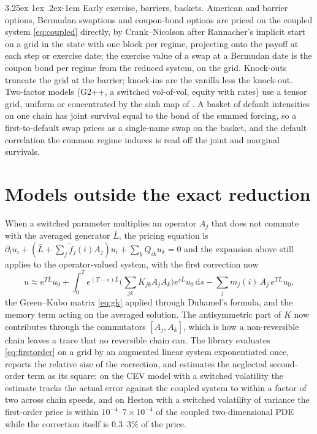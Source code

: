 \documentclass[11pt]{article}
\makeatletter
\renewcommand\paragraph{\@startsection{paragraph}{4}{\z@}%
  {3.25ex \@plus1ex \@minus.2ex}{-1em}%
  {\normalfont\normalsize\itshape}}
\theoremstyle{remark}
\newcommand{\dd}{\,\mathrm{d}}
\makeatother
\begin{document}
\paragraph{Early exercise, barriers, baskets.}
American and barrier options, Bermudan swaptions and coupon-bond options are priced on the coupled system
\eqref{eq:coupled} directly, by Crank--Nicolson after Rannacher's implicit start on a grid in the state with one
block per regime, projecting onto the payoff at each step or exercise date; the exercise value of a swap at a
Bermudan date is the coupon bond per regime from the reduced system, on the grid. Knock-outs truncate the grid at
the barrier; knock-ins are the vanilla less the knock-out. Two-factor models (G2++, a switched vol-of-vol, equity
with rates) use a tensor grid, uniform or concentrated by the sinh map of \citet{tavella2000}. A basket of
default intensities on one chain has joint survival equal to the bond of the summed forcing, so a first-to-default
swap prices as a single-name swap on the basket, and the default correlation the common regime induces is read
off the joint and marginal survivals.

\section{Models outside the exact reduction}
\label{sec:firstorder}

When a switched parameter multiplies an operator $A_j$ that does not commute with the averaged generator
$\bar L$, the pricing equation is $\partial_t u_i + (\bar L + \sum_j \tilde f_j(i) A_j)u_i + \sum_k Q_{ik}u_k = 0$ and
the expansion above still applies to the operator-valued system, with the first
correction now
\begin{equation}
  u \approx e^{T\bar L}u_0 + \int_0^T e^{(T-s)\bar L}\Big(\sum_{jk} K_{jk}A_jA_k\Big)e^{s\bar L}u_0\dd s - \sum_j m_j(i)\,A_j\,e^{T\bar L}u_0,
  \label{eq:firstorder}
\end{equation}
the Green--Kubo matrix \eqref{eq:gk} applied through Duhamel's formula, and the memory term acting on the averaged
solution. The antisymmetric part of $K$ now contributes through the commutators $[A_j, A_k]$, which is how a
non-reversible chain leaves a trace that no reversible chain can. The library evaluates \eqref{eq:firstorder} on
a grid by an augmented linear system exponentiated once, reports the relative size of the correction, and
estimates the neglected second-order term as its square; on the CEV model with a switched volatility the
estimate tracks the actual error against the coupled system to within a factor of two across chain speeds, and
on Heston with a switched volatility of variance the first-order price is within $10^{-4}$--$7\times10^{-4}$ of the
coupled two-dimensional PDE while the correction itself is 0.3--3\% of the price.
\end{document}
